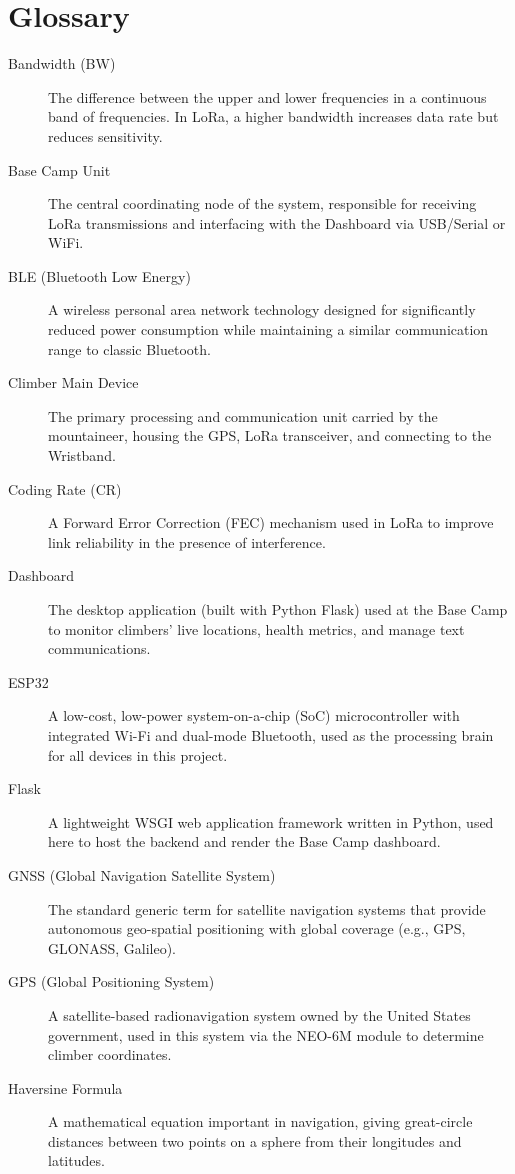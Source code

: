 \chapter{Glossary}
\label{app:glossary}

\begin{description}

\item[Bandwidth (BW)] The difference between the upper and lower frequencies in a continuous band of frequencies. In LoRa, a higher bandwidth increases data rate but reduces sensitivity.
\item[Base Camp Unit] The central coordinating node of the system, responsible for receiving LoRa transmissions and interfacing with the Dashboard via USB/Serial or WiFi.
\item[BLE (Bluetooth Low Energy)] A wireless personal area network technology designed for significantly reduced power consumption while maintaining a similar communication range to classic Bluetooth.
\item[Climber Main Device] The primary processing and communication unit carried by the mountaineer, housing the GPS, LoRa transceiver, and connecting to the Wristband.
\item[Coding Rate (CR)] A Forward Error Correction (FEC) mechanism used in LoRa to improve link reliability in the presence of interference.
\item[Dashboard] The desktop application (built with Python Flask) used at the Base Camp to monitor climbers' live locations, health metrics, and manage text communications.
\item[ESP32] A low-cost, low-power system-on-a-chip (SoC) microcontroller with integrated Wi-Fi and dual-mode Bluetooth, used as the processing brain for all devices in this project.
\item[Flask] A lightweight WSGI web application framework written in Python, used here to host the backend and render the Base Camp dashboard.
\item[GNSS (Global Navigation Satellite System)] The standard generic term for satellite navigation systems that provide autonomous geo-spatial positioning with global coverage (e.g., GPS, GLONASS, Galileo).
\item[GPS (Global Positioning System)] A satellite-based radionavigation system owned by the United States government, used in this system via the NEO-6M module to determine climber coordinates.
\item[Haversine Formula] A mathematical equation important in navigation, giving great-circle distances between two points on a sphere from their longitudes and latitudes.

\end{description}

